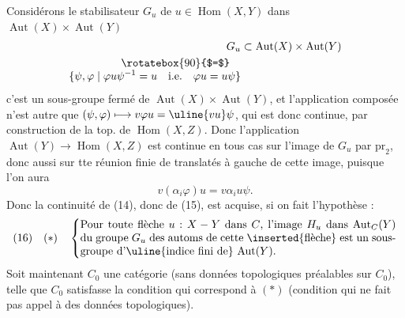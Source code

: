 Considérons  le stabilisateur 
$G_u$ de $u\in\operatorname{Hom}(X,Y)$ dans $\operatorname{Aut}(X)\times\operatorname{Aut}(Y)$
\[
\begin{aligned}
G_u&\subset\operatorname{Aut}(X)\times\operatorname{Aut}(Y)\\
\rotatebox{90}{$=$}\quad&\\[-1ex]
\{\psi,\varphi\mid\varphi u\psi^{-1}=u\quad\text{i.e.}\quad\varphi u=u\psi\}&
\end{aligned}
\]
c'est un sous-groupe fermé de $\operatorname{Aut}(X)\times\operatorname{Aut}(Y)$,
et l'application composée
n'est autre que $(\psi,\varphi)\longmapsto v\varphi u=\uline{vu}\psi$, qui est
donc continue, par construction de la top. de
$\operatorname{Hom}(X,Z)$. Donc l'application $\operatorname{Aut}(Y)\longrightarrow\operatorname{Hom}(X,Z)$
est continue en tous cas sur l'image  de $G_u$
par $\mathrm{pr}_2$,  donc aussi sur tte réunion
finie de translatés à gauche  de cette image,
puisque l'on aura 
\[
v(\alpha_i\varphi)u=v\alpha_i u\psi.
\]
Donc la continuité de (14), donc de (15), est
acquise, si on fait l'hypothèse :
\[
(16)\quad(*)\quad\left\{
\begin{minipage}{0.83\linewidth}
Pour toute flèche $u:X\mathbin{-}Y$ dans $C$, l'image
$H_u$ dans $\operatorname{Aut}_C(Y)$ du groupe $G_u$ des automs de cette
\inserted{flèche} est un sous-groupe d'\uline{indice fini de}
$\operatorname{Aut}(Y)$.
\end{minipage}\right.
\]
Soit maintenant $C_0$ une catégorie (sans
données topologiques préalables sur $C_0$),
telle que $C_0$ satisfasse la condition
qui correspond à $(*)$ (condition qui ne
fait pas appel à des données topologiques).

